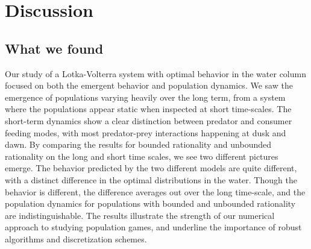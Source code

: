 \section{Discussion}
\subsection*{What we found} %

Our study of a Lotka-Volterra system with optimal behavior in the water column focused on both the emergent behavior and population dynamics. We saw the emergence of populations varying heavily over the long term, from a system where the populations appear static when inspected at short time-scales. The short-term dynamics show a clear distinction between predator and consumer feeding modes, with most predator-prey interactions happening at dusk and dawn. By comparing the results for bounded rationality and unbounded rationality on the long and short time scales, we see two different pictures emerge. The behavior predicted by the two different models are quite different, with a distinct difference in the optimal distributions in the water. Though the behavior is different, the difference averages out over the long time-scale, and the population dynamics for populations with bounded and unbounded rationality are indistinguishable. The results illustrate the strength of our numerical approach to studying population games, and underline the importance of robust algorithms and discretization schemes.


